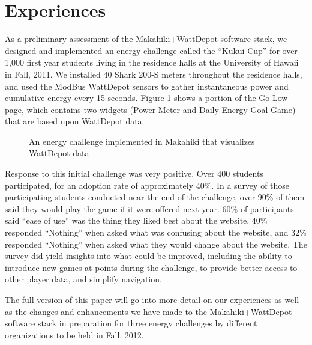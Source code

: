 \section{Experiences}

As a preliminary assessment of the Makahiki+WattDepot software stack, we designed and implemented an energy challenge called the ``Ku\-kui Cup'' for over 1,000 first year students living in the residence halls at the University of Hawaii in Fall, 2011.  We installed 40 Shark 200-S meters throughout the residence halls, and used the ModBus WattDepot sensors to gather instantaneous power and cumulative energy every 15 seconds. Figure \ref{fig:golow} shows a portion of the Go Low page, which contains two widgets (Power Meter and Daily Energy Goal Game) that are based upon WattDepot data.

\begin{figure}
\begin{center}
\end{center}
\caption{An energy challenge implemented in Makahiki that visualizes WattDepot data}
\label{fig:golow}
\end{figure}

Response to this initial challenge was very positive.   Over 400 students participated, for an adoption rate of approximately 40\%.  In a survey of those participating students conducted near the end of the challenge, over 90\% of them said they would play the game if it were offered next year.  60\% of participants said ``ease of use'' was the thing they liked best about the website.  40\% responded ``Nothing'' when asked what was confusing about the website, and 32\% responded ``Nothing'' when asked what they would change about the website.  The survey did yield insights into what could be improved, including the ability to introduce new games at points during the challenge, to provide better access to other player data, and simplify navigation.

The full version of this paper will go into more detail on our experiences as well as the changes and enhancements we have made to the Makahiki+WattDepot software stack in preparation for three energy challenges by different organizations to be held in Fall, 2012.

